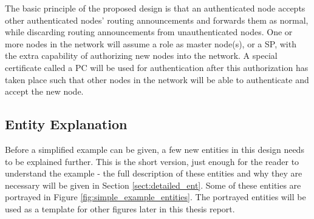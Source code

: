 The basic principle of the proposed design is that an authenticated node accepts
other authenticated nodes' routing announcements and forwards them as normal, while
discarding routing announcements from unauthenticated nodes. One or more nodes in the
network will assume a role as master node(s), or a \ac{SP}, with the extra
capability of authorizing new nodes into the network. A special certificate
called a \ac{PC} \cite{rfc3820} will be used for authentication after this
authorization has taken place such that other nodes in the network will be able
to authenticate and accept the new node.

\subsection{Entity Explanation}
Before a simplified example can be given, a few new entities in this design
needs to be explained further. This is the short version, just enough for the
reader to understand the example - the full description of these entities
and why they are necessary will be given in Section \ref{sect:detailed_ent}.
Some of these entities are portrayed in Figure
\ref{fig:simple_example_entities}. The portrayed entities will be used as a
template for other figures later in this thesis report.

